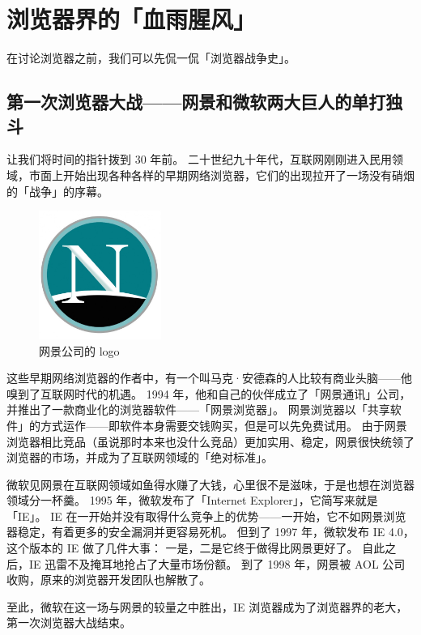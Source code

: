 \section{浏览器界的「血雨腥风」}

在讨论浏览器之前，我们可以先侃一侃「浏览器战争史」。

\subsection[第一次浏览器大战——网景和微软两大巨人的单打独斗]{第一次浏览器大战{\normalsize ——网景和微软两大巨人的单打独斗}}

让我们将时间的指针拨到 30 年前。
二十世纪九十年代，互联网刚刚进入民用领域，市面上开始出现各种各样的早期网络浏览器，它们的出现拉开了一场没有硝烟的「战争」的序幕。

\begin{figure}
  \centering
  \includegraphics[width=4cm]{assets/Netscape.png}
  \caption{网景公司的 logo}
  \label{Netscape}
\end{figure}

这些早期网络浏览器的作者中，有一个叫马克·安德森的人比较有商业头脑——他嗅到了互联网时代的机遇。
1994 年，他和自己的伙伴成立了「网景通讯」公司，并推出了一款商业化的浏览器软件——「网景浏览器」。
网景浏览器以「共享软件」的方式运作——即软件本身需要交钱购买，但是可以先免费试用。
由于网景浏览器相比竞品（虽说那时本来也没什么竞品）更加实用、稳定，网景很快统领了浏览器的市场，并成为了互联网领域的「绝对标准」。

微软见网景在互联网领域如鱼得水赚了大钱，心里很不是滋味，于是也想在浏览器领域分一杯羹。
1995 年，微软发布了「Internet Explorer」，它简写来就是「IE」。
IE 在一开始并没有取得什么竞争上的优势——一开始，它不如网景浏览器稳定，有着更多的安全漏洞并更容易死机。
但到了 1997 年，微软发布 IE 4.0，这个版本的 IE 做了几件大事：
一是，二是它终于做得比网景更好了。
自此之后，IE 迅雷不及掩耳地抢占了大量市场份额。
到了 1998 年，网景被 AOL 公司收购，原来的浏览器开发团队也解散了。

至此，微软在这一场与网景的较量之中胜出，IE 浏览器成为了浏览器界的老大，第一次浏览器大战结束。

